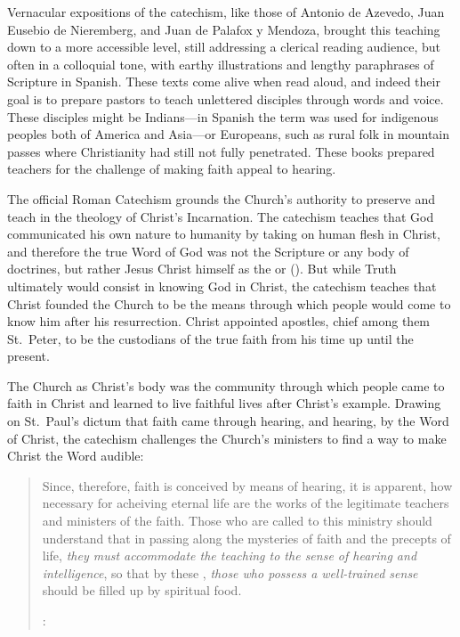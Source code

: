 Vernacular expositions of the catechism, like those of Antonio de Azevedo, Juan Eusebio de Nieremberg, and Juan de Palafox y Mendoza, brought this teaching down to a more accessible level, still addressing a clerical reading audience, but often in a colloquial tone, with earthy illustrations and lengthy paraphrases of Scripture in Spanish.
These texts come alive when read aloud, and indeed their goal is to prepare pastors to teach unlettered disciples through words and voice.
These disciples might be Indians---in Spanish the term was used for indigenous peoples both of America and Asia---or Europeans, such as rural folk in mountain passes where Christianity had still not fully penetrated.
These books prepared teachers for the challenge of making faith appeal to hearing.

The official Roman Catechism grounds the Church's authority to preserve and teach  in the theology of Christ's Incarnation.
The catechism teaches that God communicated his own nature to humanity by taking on human flesh in Christ, and therefore the true Word of God was not the Scripture or any body of doctrines, but rather Jesus Christ himself as the  or  ().
But while Truth ultimately would consist in knowing God in Christ, the catechism teaches that Christ founded the Church to be the means through which people would come to know him after his resurrection.
Christ appointed apostles, chief among them St.\ Peter, to be the custodians of the true faith from his time up until the present.

The Church as Christ's body was the community through which people came to faith in Christ and learned to live faithful lives after Christ's example.
Drawing on St.\ Paul's dictum that faith came through hearing, and hearing, by the Word of Christ, the catechism challenges the Church's ministers to find a way to make Christ the Word audible:
\begin{quote}
Since, therefore, faith is conceived by means of hearing, it is apparent, how necessary for acheiving eternal life are the works of the legitimate teachers and ministers of the faith. \Dots{}
Those who are called to this ministry should understand that in passing along the mysteries of faith and the precepts of life, \emph{they must accommodate the teaching to the sense of hearing and intelligence}, so that by these , \emph{those who possess a well-trained sense} should be filled up by spiritual food.%
  \begin{Footnote}
  \Autocite[2, 8--9 (emphasis added)]{Catholic:Catechismus1614}: 
  \end{Footnote}
\end{quote}

